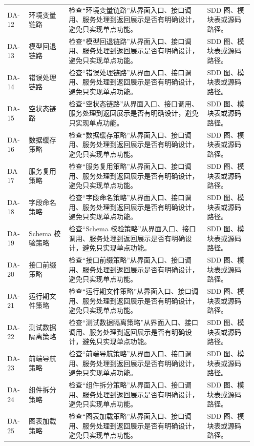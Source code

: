 \documentclass[12pt,a4paper]{ctexart}
\begin{document}
\begin{longtable}{L{1.7cm}L{4.0cm}L{6.2cm}L{3.6cm}}
DA-12 & 环境变量链路 & 检查“环境变量链路”从界面入口、接口调用、服务处理到返回展示是否有明确设计，避免只实现单点功能。 & SDD 图、模块表或源码路径。 \\
DA-13 & 模型回退链路 & 检查“模型回退链路”从界面入口、接口调用、服务处理到返回展示是否有明确设计，避免只实现单点功能。 & SDD 图、模块表或源码路径。 \\
DA-14 & 错误处理链路 & 检查“错误处理链路”从界面入口、接口调用、服务处理到返回展示是否有明确设计，避免只实现单点功能。 & SDD 图、模块表或源码路径。 \\
DA-15 & 空状态链路 & 检查“空状态链路”从界面入口、接口调用、服务处理到返回展示是否有明确设计，避免只实现单点功能。 & SDD 图、模块表或源码路径。 \\
DA-16 & 数据缓存策略 & 检查“数据缓存策略”从界面入口、接口调用、服务处理到返回展示是否有明确设计，避免只实现单点功能。 & SDD 图、模块表或源码路径。 \\
DA-17 & 服务复用策略 & 检查“服务复用策略”从界面入口、接口调用、服务处理到返回展示是否有明确设计，避免只实现单点功能。 & SDD 图、模块表或源码路径。 \\
DA-18 & 字段命名策略 & 检查“字段命名策略”从界面入口、接口调用、服务处理到返回展示是否有明确设计，避免只实现单点功能。 & SDD 图、模块表或源码路径。 \\
DA-19 & Schema 校验策略 & 检查“Schema 校验策略”从界面入口、接口调用、服务处理到返回展示是否有明确设计，避免只实现单点功能。 & SDD 图、模块表或源码路径。 \\
DA-20 & 接口前缀策略 & 检查“接口前缀策略”从界面入口、接口调用、服务处理到返回展示是否有明确设计，避免只实现单点功能。 & SDD 图、模块表或源码路径。 \\
DA-21 & 运行期文件策略 & 检查“运行期文件策略”从界面入口、接口调用、服务处理到返回展示是否有明确设计，避免只实现单点功能。 & SDD 图、模块表或源码路径。 \\
DA-22 & 测试数据隔离策略 & 检查“测试数据隔离策略”从界面入口、接口调用、服务处理到返回展示是否有明确设计，避免只实现单点功能。 & SDD 图、模块表或源码路径。 \\
DA-23 & 前端导航策略 & 检查“前端导航策略”从界面入口、接口调用、服务处理到返回展示是否有明确设计，避免只实现单点功能。 & SDD 图、模块表或源码路径。 \\
DA-24 & 组件拆分策略 & 检查“组件拆分策略”从界面入口、接口调用、服务处理到返回展示是否有明确设计，避免只实现单点功能。 & SDD 图、模块表或源码路径。 \\
DA-25 & 图表加载策略 & 检查“图表加载策略”从界面入口、接口调用、服务处理到返回展示是否有明确设计，避免只实现单点功能。 & SDD 图、模块表或源码路径。 \\

\end{longtable}
\end{document}
